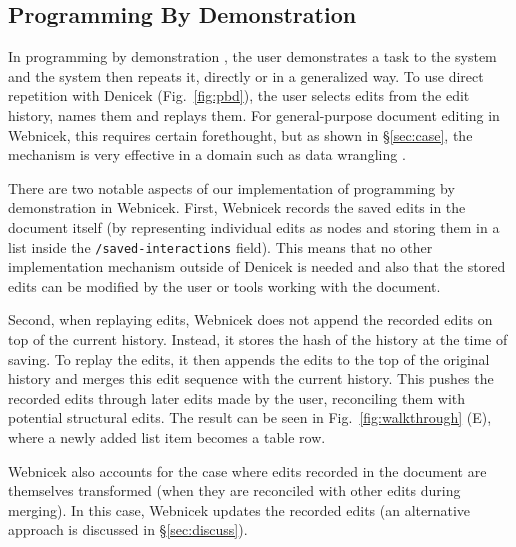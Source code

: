 \documentclass[sigconf]{acmart}
\begin{document}

\subsection{Programming By Demonstration}
\label{sec:impl-pbd}

In programming by demonstration \cite{cypher-1993-pbd}, the user demonstrates a task to the
system and the system then repeats it, directly or in a generalized way. To use direct
repetition with Denicek (Fig.~\ref{fig:pbd}), the user selects edits from the edit history,
names them and replays them. For general-purpose document editing in Webnicek, this requires
certain forethought, but as shown in \S\ref{sec:case}, the mechanism is very effective
in a domain such as data wrangling \cite{kandel-2011-wrangler}.

There are two notable aspects of our implementation of programming by demonstration in Webnicek.
First, Webnicek records the saved edits in the document itself (by representing individual edits
as nodes and storing them in a list inside the {\small\Verb_/saved-interactions_} field).
This means that no other implementation mechanism outside of Denicek is needed and also
that the stored edits can be modified by the user or tools working with the document.

Second, when replaying edits, Webnicek does not append the recorded edits on top of the current
history. Instead, it stores the hash of the history at the time of saving. To replay the edits,
it then appends the edits to the top of the original history and merges this edit sequence
with the current history. This pushes the recorded edits through later edits made by the user,
reconciling them with potential structural edits. The result can be seen in Fig.~\ref{fig:walkthrough} (E), where
a newly added list item becomes a table row.

Webnicek also accounts for the case where edits recorded in the document are themselves
transformed (when they are reconciled with other edits during merging). In this case, Webnicek
updates the recorded edits (an alternative approach is discussed in \S\ref{sec:discuss}).

\end{document}
